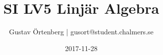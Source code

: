\documentclass{article}
\title{SI LV5 Linjär Algebra}
\author{Gustav Örtenberg | \small{gusort@student.chalmers.se}}
\date{2017-11-28}
\begin{document}
\maketitle
\section{}


\section{}


\section{}


\section{}

\end{document}
